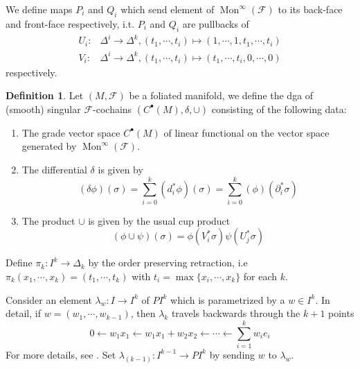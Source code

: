 \documentclass[12pt]{amsart}
\theoremstyle{definition}
\newtheorem{defn}[thm]{Definition}
\theoremstyle{remark}
\numberwithin{equation}{section}
\newcommand{\del}{\partial}
\renewcommand{\del}{\partial}
\newcommand{\CF}{{\mathcal F}}
\newcommand{\1}{{\mathbb{1}}}
\newcommand{\bt}{\bullet}
\newcommand{\mon}{\operatorname{Mon}}
\begin{document}
We  define  maps $P_i$ and $Q_i$ which send element of $\mon^{\infty} (\CF)$ to its back-face and front-face respectively, i.t. $P_i$ and $Q_i$ are pullbacks of 
\begin{align*}
    U_i:& \Delta^i \to \Delta^k, (t_1, \cdots, t_i) \mapsto (1, \cdots, 1, t_1, \cdots, t_i)\\
     V_i:& \Delta^i \to \Delta^k, (t_1, \cdots, t_i) \mapsto ( t_1, \cdots, t_i,0, \cdots, 0)
\end{align*}
respectively.
\begin{defn}
    Let $(M, \CF)$ be a foliated manifold, we define the dga of (smooth) singular $\CF$-cochains $(C^{\bt}(M), \delta, \cup)$ consisting of the following data:
    \begin{enumerate}
        \item The grade vector space $C^{\bt}(M)$ of linear functional on the vector space generated by $\mon^{\infty}(\CF)$.
        \item The differential $\delta$ is given by
        \begin{equation*}
            (\delta \phi)(\sigma) = \sum_{i=0}^k(d^*_i\phi)(\sigma)=\sum_{i=0}^k(\phi)(\del^*_i\sigma)
        \end{equation*}
        \item The product $\cup$ is given by the usual cup product
        \begin{equation*}
            (\phi \cup \psi)(\sigma) = \phi(V_i^*\sigma)\psi(U_j^*\sigma)
        \end{equation*}
    \end{enumerate}
\end{defn}
Define $\pi_k: I^k \to \Delta_k$ by the order preserving retraction, i.e $\pi_k(x_1,\cdots, x_k) = (t_1, \cdots, t_k)$ with $t_i = \max\{x_i, \cdots, x_k\}$ for each $k$.

Consider an element $\lambda_w: I\to I^{k}$ of $PI^k$ which is parametrized by a $w\in I^k$. In detail, if $w = (w_1, \cdots, w_{k-1})$, then $\lambda_k$ travels backwards through the $k+1$ points
\begin{equation*}
    0 \leftarrow w_1x_1 \leftarrow w_1 x_1 + w_2 x_2 \leftarrow \cdots \leftarrow \sum_{i = 1}^k w_i e_i
\end{equation*}
For more details, see \cite[Proposition 4.6]{Igu09}. 
Set $\lambda_{(k-1)}: I^{k-1} \to PI^k$ by sending $w$ to $\lambda_w$.
\end{document}
